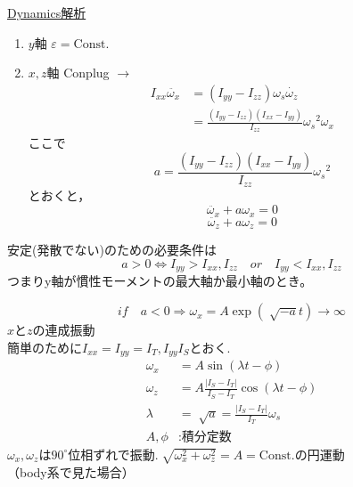 \documentclass[class=article, crop=false, dvipdfmx]{standalone}
\begin{document}
\noindent
\underline{Dynamics解析}
\begin{enumerate}[label=\theenumi)]
\item $y$軸 \qquad $\varepsilon = \mathrm{Const.}$
\item $x, z$軸 \quad Conplug $\rightarrow$ 
	\begin{align}
    I_{xx} \ddot{\omega_x} & = (I_{yy} - I_{zz})\omega_s \dot{\omega_z} \\
    		&= \frac{(I_{yy}-I_{zz})(I_{xx}-I_{yy})}{I_{zz}} {\omega_s}^2 \omega_x
    \end{align}
    ここで
    \[ a = \frac{(I_{yy}-I_{zz})(I_{xx}-I_{yy})}{I_{zz}} {\omega_s}^2 \]
    とおくと，
    \[ \ddot{\omega_x} + a\omega_x = 0 \]
    \[ \ddot{\omega_z} + a\omega_z = 0 \]
\end{enumerate}
安定(発散でない)のための必要条件は
\begin{equation}
a>0\Leftrightarrow I_{yy}>I_{xx},I_{zz}\quad or \quad I_{yy}
< I_{xx}, I_{zz}
\end{equation}
つまりy軸が慣性モーメントの最大軸か最小軸のとき。

\begin{minipage}{0.45\linewidth}

\end{minipage}
\begin{minipage}{0.3\linewidth}

\end{minipage}


\begin{equation}
if\quad a<0 \Rightarrow
\omega_x=
A\exp(\sqrt[]{-a}t)\rightarrow\infty
\end{equation}
$x$と$z$の連成振動\\
簡単のために$I_{xx} = I_{yy}=I_T,I_{yy}I_S$とおく.\\
\begin{align}
\omega_x&=A\sin(\lambda t-\phi)\\
\omega_z&=A\frac{|I_S-I_T|}{I_S-I_T}
\cos(\lambda t-\phi)\\
\lambda&=\sqrt[]{a}=\frac{|I_S-I_T|}{I_T}\omega_s\\
A,\phi&:\text{積分定数}
\end{align}
$\omega_x,\omega_z$は$90^\circ$位相ずれで振動.$\sqrt[]{\omega_x^2+\omega_z^2}=A=\mathrm{Const.}$の円運動\\


\noindent
（body系で見た場合）\\
\begin{center}
\begin{minipage}{0.45\linewidth}

\end{minipage}
\hspace{3zw}
\begin{minipage}{0.45\linewidth}

\end{minipage}
\end{center}
\vspace{\baselineskip}
\end{document}
